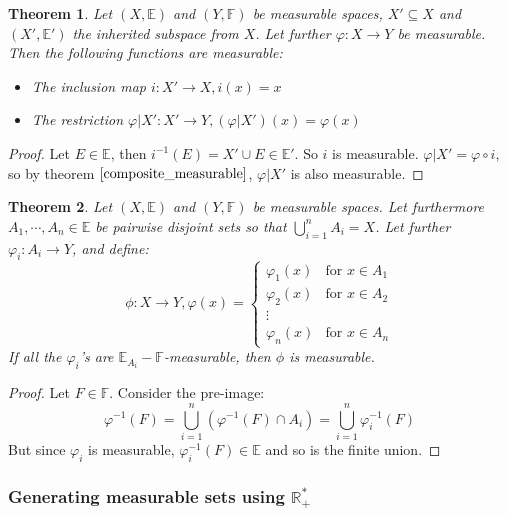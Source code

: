 \documentclass[12pt, a4paper]{article}
\newtheorem{theorem}{Theorem}[section]
\numberwithin{equation}{section}
\begin{document}
\begin{theorem}
Let $(X,\mathbb{E})$ and $(Y,\mathbb{F})$ be measurable spaces, $X'\subseteq X$ and $(X',\mathbb{E}')$ the inherited subspace from $X$. Let further $\varphi: X\rightarrow Y$ be measurable. Then the following functions are measurable:
\begin{itemize}
\item The inclusion map $i: X'\rightarrow X, i(x)=x$
\item The restriction $\varphi|X': X'\rightarrow Y, (\varphi|X')(x)=\varphi(x)$
\end{itemize}
\end{theorem}
\begin{proof}
Let $E\in\mathbb{E}$, then $i^{-1}(E)=X'\cup E\in\mathbb{E}'$. So $i$ is measurable. $\varphi|X'=\varphi\circ i$, so by theorem $\ref{composite_measurable}$, $\varphi|X'$ is also measurable.
\end{proof}

\begin{theorem}
\label{cases_measurable}
Let $(X,\mathbb{E})$ and $(Y,\mathbb{F})$ be measurable spaces. Let furthermore $A_1,\cdots, A_n\in\mathbb{E}$ be pairwise disjoint sets so that $\bigcup_{i=1}^n A_i=X$. Let further $\varphi_i: A_i\rightarrow Y$, and define:
\begin{equation}
\phi: X\rightarrow Y, \varphi(x)=
\begin{cases}
\varphi_1(x)	& \textrm{for }x\in A_1 \\
\varphi_2(x)	& \textrm{for }x\in A_2 \\
\vdots \\
\varphi_n(x)	& \textrm{for }x\in A_n
\end{cases}
\end{equation} 
If all the $\varphi_i$'s are $\mathbb{E}_{A_i}-\mathbb{F}$-measurable, then $\phi$ is measurable.
\end{theorem}
\begin{proof}
Let $F\in\mathbb{F}$. Consider the pre-image:
\begin{equation}
\varphi^{-1}(F)=\bigcup_{i=1}^n(\varphi^{-1}(F)\cap A_i)=\bigcup_{i=1}^n\varphi_i^{-1}(F)
\end{equation}
But since $\varphi_i$ is measurable, $\varphi_i^{-1}(F)\in\mathbb{E}$ and so is the finite union.
\end{proof}

\subsubsection{Generating measurable sets using $\mathbb{R}^*_+$}
\end{document}
